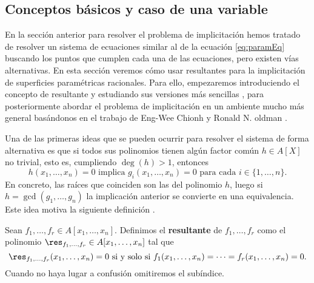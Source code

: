 \subsection{Conceptos básicos y caso de una variable}
En la sección anterior para resolver el problema de implicitación hemos tratado de resolver un sistema de ecuaciones similar al de la ecuación \eqref{eq:paramEq} buscando los puntos que cumplen cada una de las ecuaciones, pero existen vías alternativas. En esta sección veremos cómo usar resultantes para la implicitación de superficies paramétricas racionales. Para ello, empezaremos introduciendo el concepto de resultante y estudiando sus versiones más sencillas \cite{ideals_varieties}, para posteriormente abordar el problema de implicitación en un ambiente mucho más general basándonos en el trabajo de Eng-Wee Chionh y Ronald N. oldman \cite{res1}.\newline

Una de las primeras ideas que se pueden ocurrir para resolver el sistema de forma alternativa es que si todos sus polinomios tienen algún factor común $h\in A[X]$ no trivial, esto es, cumpliendo $\deg(h)>1$, entonces
$$h(x_1,\dots, x_n) = 0 \text{ implica } g_i(x_1,\dots, x_n)=0 \text{ para cada } i\in\{1,\dots, n\}.$$
En concreto, las raíces que coinciden son las del polinomio $h$, luego si $h = \gcd(g_1,\dots, g_n)$ la implicación anterior se convierte en una equivalencia. Este idea motiva la siguiente definición \cite{res3}.
\begin{definicion}\label{def:resultant}
    Sean $f_1,\dots , f_r \in A[x_1,\dots, x_n]$. Definimos el \textbf{resultante} de $f_1,\dots, f_r$ como el polinomio $\res_{f_1,\dots, f_r} \in A[x_1,\dots, x_n]$ tal que
    \begin{equation*}
        \res_{f_1,\dots, f_r}(x_1,\dots, x_n) = 0 \text{ si y solo si } f_1(x_1,\dots, x_n) = \cdots =  f_r(x_1,\dots, x_n) = 0.
    \end{equation*}
    Cuando no haya lugar a confusión omitiremos el subíndice.
\end{definicion}


